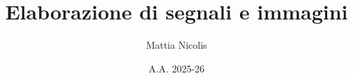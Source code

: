 \documentclass[a4paper,12pt,openright]{book}
\title{\textbf{Elaborazione di segnali e immagini}}
\author{Mattia Nicolis}
\date{A.A. 2025-26}
\begin{document}
    \maketitle

    \tableofcontents
    \markboth{}{}
\end{document}
